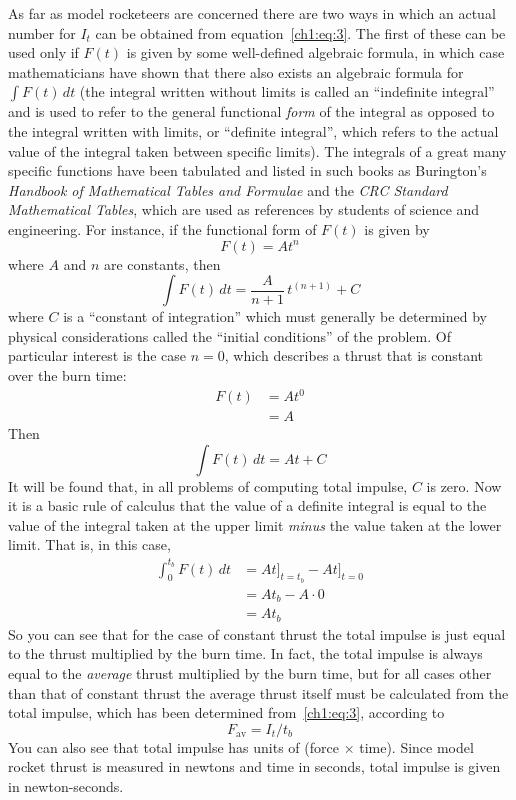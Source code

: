 As far as model rocketeers are concerned there are two ways in which an actual number for $I_t$
can be obtained from equation~\eqref{ch1:eq:3}. The first of these can be used only if $F(t)$ is
given by some well-defined algebraic formula, in which case mathematicians have shown that there
also exists an algebraic formula for $\int F(t)\,dt$ (the integral written without limits is
called an ``indefinite integral'' and is used to refer to the general functional \emph{form} of
the integral as opposed to the integral written with limits, or ``definite integral'', which
refers to the actual value of the integral taken between specific limits). The integrals of a
great many specific functions have been tabulated and listed in such books as Burington's
\emph{Handbook of Mathematical Tables and Formulae} and the \emph{CRC Standard Mathematical
Tables}, which are used as references by students of science and engineering. For instance, if
the functional form of $F(t)$ is given by
\begin{equation*}
F(t) = At^{n}
\end{equation*}
where $A$ and $n$ are constants, then
\begin{equation*}
\int F(t)\,dt = \frac{A}{n+1}\,t^{(n+1)} + C
\end{equation*}
where $C$ is a ``constant of integration'' which must generally be determined by physical
considerations called the ``initial conditions'' of the problem. Of particular interest is the
case $n = 0$, which describes a thrust that is constant over the burn time:
\begin{align*}
F(t) &= At^{0}\\
&= A
\end{align*}
Then
\begin{equation*}
\int F(t)\,dt = At + C
\end{equation*}
It will be found that, in all problems of computing total impulse, $C$ is zero. Now it is a basic
rule of calculus that the value of a definite integral is equal to the value of the integral
taken at the upper limit \emph{minus} the value taken at the lower limit. That is, in this case,
\begin{align*}
\int_{0}^{t_b} F(t)\,dt &= At\bigr]_{t=t_b} - At\bigr]_{t=0}\\
&= At_b - A\cdot 0\\
&= At_b
\end{align*}
So you can see that for the case of constant thrust the total impulse is just equal to the thrust
multiplied by the burn time. In fact, the total impulse is always equal to the \emph{average}
thrust multiplied by the burn time, but for all cases other than that of constant thrust the
average thrust itself must be calculated from the total impulse, which has been determined
from~\eqref{ch1:eq:3}, according to
\begin{equation}\label{ch1:eq:4}
F_{\mathrm{av}} = I_t/t_b
\end{equation}
You can also see that total impulse has units of (force $\times$ time). Since model rocket thrust
is measured in newtons and time in seconds, total impulse is given in newton-seconds.

